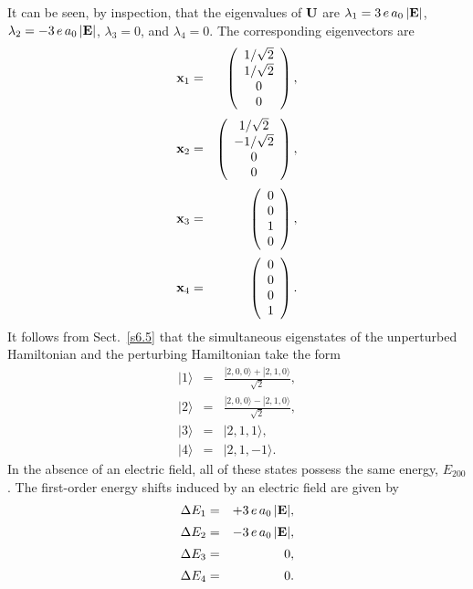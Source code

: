 It can be seen, by inspection, that the eigenvalues of ${\bf U}$ are
$\lambda_1= 3\,e\,a_0\,|{\bf E}|$, $\lambda_2 = -  3\,e\,a_0\,|{\bf E}|$, $\lambda_3=0$,
and $\lambda_4 =0$. The corresponding eigenvectors are
\begin{eqnarray}
{\bf x}_1 &=& \left( \begin{array}{c} 1/\sqrt{2} \\ 1/\sqrt{2} \\ 0 \\ 0 \end{array}
\right),\\[0.5ex]
{\bf x}_2 &=& \left( \begin{array}{c} 1/\sqrt{2} \\- 1/\sqrt{2} \\ 0 \\ 0 \end{array}
\right),\\[0.5ex]
{\bf x}_3 &=& \left( \begin{array}{c} 0 \\0 \\ 1 \\0 \end{array}
\right),\\[0.5ex]
{\bf x}_4 &=& \left( \begin{array}{c} 0 \\ 0\\ 0 \\ 1\end{array}
\right).
\end{eqnarray}
It follows from Sect.~\ref{s6.5} that the 
simultaneous eigenstates of the unperturbed Hamiltonian and the
perturbing Hamiltonian take the form
\begin{eqnarray}
|1\rangle &=& \frac{|2,0,0\rangle + |2,1,0\rangle}{\sqrt{2}},\\[0.5ex]
|2\rangle &=& \frac{|2,0,0\rangle - |2,1,0\rangle}{\sqrt{2}},\\[0.5ex]
|3\rangle &=& |2,1,1\rangle,\\[0.5ex]
|4\rangle &=& |2,1,-1\rangle.
\end{eqnarray}
In the absence of an electric field, all of these states possess the
same energy, $E_{200}$. 
 The first-order energy shifts induced by an electric field are
given by
\begin{eqnarray}
\Delta E_1 &=& +3\,e\,a_0\, |{\bf E}|,\\[0.5ex]
\Delta E_2 &=& -3\,e\,a_0 \,|{\bf E}|,\\[0.5ex]
\Delta E_3 &=& 0,\\[0.5ex]
\Delta E_4 &=& 0.
\end{eqnarray}
